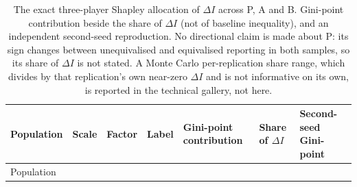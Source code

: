 \documentclass[11pt,a4paper]{article}
\begin{document}
\small\setlength{\tabcolsep}{3pt}\begin{longtable}[]{@{}
  >{\raggedright\arraybackslash}p{}
  >{\raggedright\arraybackslash}p{}
  >{\raggedright\arraybackslash}p{}
  >{\raggedright\arraybackslash}p{}
  >{\raggedright\arraybackslash}p{}
  >{\raggedright\arraybackslash}p{}
  >{\raggedright\arraybackslash}p{}@{}}
\caption{The exact three-player Shapley allocation of \(\Delta I\) across P, A and B. Gini-point contribution beside the share of \(\Delta I\) (not of baseline inequality), and an independent second-seed reproduction. No directional claim is made about P: its sign changes between unequivalised and equivalised reporting in both samples, so its share of \(\Delta I\) is not stated. A Monte Carlo per-replication share range, which divides by that replication's own near-zero \(\Delta I\) and is not informative on its own, is reported in the technical gallery, not here.}\tabularnewline
\toprule\noalign{}
\begin{minipage}[b]{\linewidth}\raggedright
Population
\end{minipage} & \begin{minipage}[b]{\linewidth}\raggedright
Scale
\end{minipage} & \begin{minipage}[b]{\linewidth}\raggedright
Factor
\end{minipage} & \begin{minipage}[b]{\linewidth}\raggedright
Label
\end{minipage} & \begin{minipage}[b]{\linewidth}\raggedright
Gini-point contribution
\end{minipage} & \begin{minipage}[b]{\linewidth}\raggedright
Share of \(\Delta I\)
\end{minipage} & \begin{minipage}[b]{\linewidth}\raggedright
Second-seed Gini-point
\end{minipage} \\
\midrule\noalign{}
\endfirsthead
\toprule\noalign{}
\begin{minipage}[b]{\linewidth}\raggedright
Population
\end{minipage} & \begin{minipage}[b]{\linewidth}\raggedright

\end{minipage}
\end{longtable}
\end{document}
